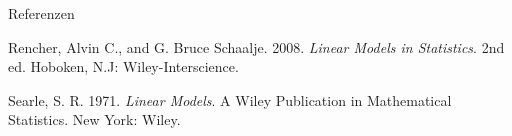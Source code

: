 \documentclass[
  8pt,
  ignorenonframetext,
]{beamer}
\newlength{\cslhangindent}
\newlength{\cslentryspacingunit} %
\newenvironment{CSLReferences}[2] %
 {%
  \setlength{\parindent}{0pt}
  \ifodd #1
  \let\oldpar\par
  \def\par{\hangindent=\cslhangindent\oldpar}
  \fi
  \setlength{\parskip}{#2\cslentryspacingunit}
 }%
 {}
\begin{document}
\begin{frame}{Referenzen}
\protect\hypertarget{referenzen}{}
\footnotesize

\hypertarget{refs}{}
\begin{CSLReferences}{1}{0}
\leavevmode{}%
Rencher, Alvin C., and G. Bruce Schaalje. 2008. \emph{Linear Models in
Statistics}. 2nd ed. {Hoboken, N.J}: {Wiley-Interscience}.

\leavevmode{}%
Searle, S. R. 1971. \emph{Linear Models}. A {Wiley} Publication in
Mathematical Statistics. {New York}: {Wiley}.

\end{CSLReferences}
\end{frame}
\end{document}
